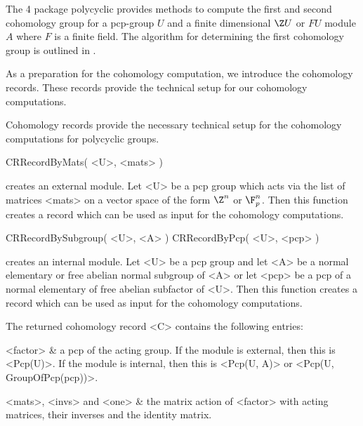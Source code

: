

The {\GAP} 4 package {\sf polycyclic} provides methods to compute the
first and second cohomology group for a pcp-group $U$ and a finite
dimensional $\Z U$ or $FU$ module $A$ where $F$ is a finite field. The
algorithm for determining the first cohomology group is outlined in
\cite{Eic00}.

As a preparation for the cohomology computation, we introduce the 
cohomology records. These records provide the technical setup for 
our cohomology computations.


Cohomology records provide the necessary technical setup for the
cohomology computations for polycyclic groups.

\>CRRecordByMats( <U>, <mats> )

creates an external module. Let <U> be a pcp group which acts via the 
list of matrices <mats> on a vector space of the form $\Z^n$ or $\F_p^n$.
Then this function creates a record which can be used as input for the
cohomology computations.

\>CRRecordBySubgroup( <U>, <A> )
\>CRRecordByPcp( <U>, <pcp> )

creates an internal module. Let <U> be a pcp group and let <A> be a 
normal elementary or free abelian normal subgroup of <A> or let <pcp>
be a pcp of a normal elementary of free abelian subfactor of <U>. Then
this function creates a record which can be used as input for the
cohomology computations. 

The returned cohomology record <C> contains the following entries:

\beginitems
<factor> &
      a pcp of the acting group. If the module is external, then this is
      <Pcp(U)>. If the module is internal, then this is <Pcp(U, A)> or
      <Pcp(U, GroupOfPcp(pcp))>.

<mats>, <invs> and <one> &
      the matrix action of <factor> with acting matrices, their inverses
      and the identity matrix.

